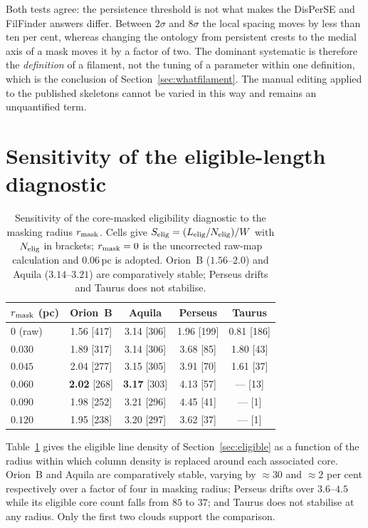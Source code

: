 \documentclass[usenatbib,twoside,twocolumn]{mnras}
\begin{document}
\smallskip\noindent Both tests agree: the persistence threshold is not what makes the DisPerSE and FilFinder answers differ. Between $2\sigma$ and $8\sigma$ the local spacing moves by less than ten per cent, whereas changing the ontology from persistent crests to the medial axis of a mask moves it by a factor of two. The dominant systematic is therefore the \emph{definition} of a filament, not the tuning of a parameter within one definition, which is the conclusion of Section~\ref{sec:whatfilament}. The manual editing applied to the published skeletons cannot be varied in this way and remains an unquantified term.




\section{Sensitivity of the eligible-length diagnostic}
\label{sec:maskapp}

\begin{table}
\caption{Sensitivity of the core-masked eligibility diagnostic to the masking radius $r_{\rm mask}$. Cells give $S_{\rm elig}=(L_{\rm elig}/N_{\rm elig})/W$ with $N_{\rm elig}$ in brackets; $r_{\rm mask}=0$ is the uncorrected raw-map calculation and $0.06$\,pc is adopted. Orion~B ($1.56$--$2.0$) and Aquila ($3.14$--$3.21$) are comparatively stable; Perseus drifts and Taurus does not stabilise.}
\label{tab:maskrad}
\footnotesize
\setlength{\tabcolsep}{4pt}
\begin{tabular}{lcccc}
\toprule
$r_{\rm mask}$ (pc) & Orion~B & Aquila & Perseus & Taurus \\
\midrule
$0$ (raw) & 1.56 [417] & 3.14 [306] & 1.96 [199] & 0.81 [186] \\
$0.030$   & 1.89 [317] & 3.14 [306] & 3.68 [85]  & 1.80 [43] \\
$0.045$   & 2.04 [277] & 3.15 [305] & 3.91 [70]  & 1.61 [37] \\
$0.060$   & \textbf{2.02} [268] & \textbf{3.17} [303] & 4.13 [57] & --- [13] \\
$0.090$   & 1.98 [252] & 3.21 [296] & 4.45 [41]  & --- [1] \\
$0.120$   & 1.95 [238] & 3.20 [297] & 3.62 [37]  & --- [1] \\
\bottomrule
\end{tabular}
\end{table}

Table~\ref{tab:maskrad} gives the eligible line density of Section~\ref{sec:eligible} as a function of the radius within which column density is replaced around each associated core. Orion~B and Aquila are comparatively stable, varying by $\approx30$ and $\approx2$ per cent respectively over a factor of four in masking radius; Perseus drifts over $3.6$--$4.5$ while its eligible core count falls from $85$ to $37$; and Taurus does not stabilise at any radius. Only the first two clouds support the comparison.
\end{document}
